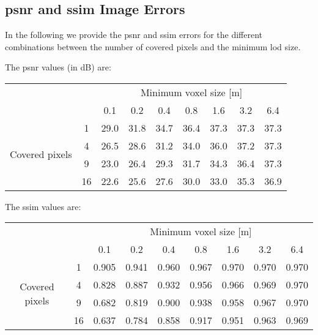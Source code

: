 \chapter{}

\section{\acs{psnr} and \acs{ssim} Image Errors}
\label{sec:psnr_and_ssim_errors}
In the following we provide the \ac{psnr} and \ac{ssim} errors for the different combinations between the number of covered pixels and the minimum \ac{lod} size.

The \ac{psnr} values (in dB) are:
\begin{center}
    \begin{tabular}{| c | c | c | c | c | c | c | c | c |}
        \cline{3-9}
        \multicolumn{2}{c|}{} & \multicolumn{7}{c|}{Minimum voxel size [m]} \\
        \cline{3-9}
        \multicolumn{2}{c|}{} & 0.1 & 0.2 & 0.4 & 0.8 & 1.6 & 3.2 & 6.4 \\
        \hline
        \multirow{4}{*}{Covered pixels}& 1 & 29.0 & 31.8 & 34.7 & 36.4 & 37.3 & 37.3 & 37.3 \\
        \cline{2-9}
        & 4 & 26.5 & 28.6 & 31.2 & 34.0 & 36.0 & 37.2 & 37.3 \\
        \cline{2-9}
        & 9 & 23.0 & 26.4 & 29.3 & 31.7 & 34.3 & 36.4 & 37.3 \\
        \cline{2-9}
        & 16 & 22.6 & 25.6 & 27.6 & 30.0 & 33.0 & 35.3 & 36.9 \\
        \hline
    \end{tabular}
\end{center}

The \ac{ssim} values are:
\begin{center}
    \begin{tabular}{| c | c | c | c | c | c | c | c | c |}
        \cline{3-9}
        \multicolumn{2}{c|}{} & \multicolumn{7}{c|}{Minimum voxel size [m]} \\
        \cline{3-9}
        \multicolumn{2}{c|}{} & 0.1 & 0.2 & 0.4 & 0.8 & 1.6 & 3.2 & 6.4 \\
        \hline
        \multirow{4}{*}{Covered pixels}& 1 & 0.905 & 0.941 & 0.960 & 0.967 & 0.970 & 0.970 & 0.970 \\
        \cline{2-9}
        & 4 & 0.828 & 0.887 & 0.932 & 0.956 & 0.966 & 0.969 & 0.970 \\
        \cline{2-9}
        & 9 & 0.682 & 0.819 & 0.900 & 0.938 & 0.958 & 0.967 & 0.970 \\
        \cline{2-9}
        & 16 & 0.637 & 0.784 & 0.858 & 0.917 & 0.951 & 0.963 & 0.969 \\
        \hline
    \end{tabular}
\end{center}